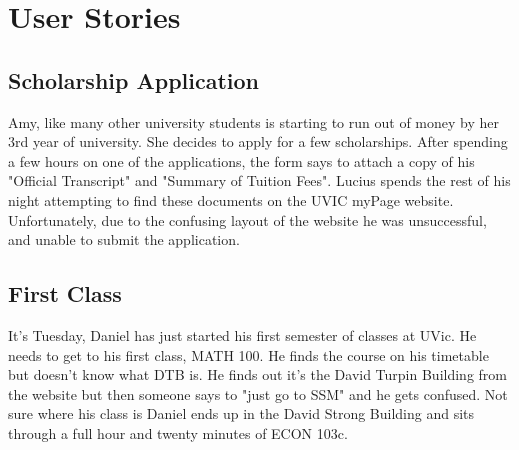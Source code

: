 \documentclass{article}
\begin{document}

\section{User Stories}

\subsection{Scholarship Application}

Amy, like many other university students is starting to run out of money by her 3rd year of university. She decides to apply for a few scholarships. After spending a few hours on one of the applications, the form says to attach a copy of his "Official Transcript" and "Summary of Tuition Fees". Lucius spends the rest of his night attempting to find these documents on the UVIC myPage website. Unfortunately, due to the confusing layout of the website he was unsuccessful, and unable to submit the application.

\subsection{First Class}

It's Tuesday, Daniel has just started his first semester of classes at UVic. He needs to get to his first class, MATH 100. He finds the course on his timetable but doesn't know what DTB is. He finds out it's the David Turpin Building from the website but then someone says to "just go to SSM" and he gets confused. Not sure where his class is Daniel ends up in the David Strong Building and sits through a full hour and twenty minutes of ECON 103c.
\end{document}
